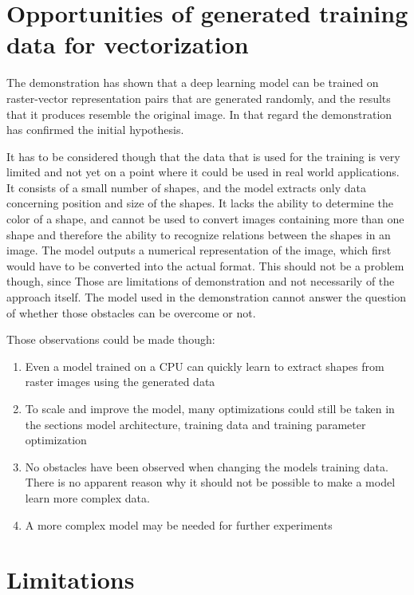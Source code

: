 \documentclass[12pt, a4paper, titlepage]{report}
\begin{document}
\section{Opportunities of generated training data for vectorization}

The demonstration has shown that a deep learning model can be trained on raster-vector representation pairs that are generated randomly, and the results that it produces resemble the original image. In that regard the demonstration has confirmed the initial hypothesis.

It has to be considered though that the data that is used for the training is very limited and not yet on a point where it could be used in real world applications. It consists of a small number of shapes, and the model extracts only data concerning position and size of the shapes. It lacks the ability to determine the color of a shape, and cannot be used to convert images containing more than one shape and therefore the ability to recognize relations between the shapes in an image. The model outputs a numerical representation of the image, which first would have to be converted into the actual format. This should not be a problem though, since 
Those are limitations of demonstration and not necessarily of the approach itself. The model used in the demonstration cannot answer the question of whether those obstacles can be overcome or not.

Those observations could be made though:

\begin{enumerate}[label=\Roman*]
   \item Even a model trained on a CPU can quickly learn to extract shapes from raster images using the generated data
   \item To scale and improve the model, many optimizations could still be taken in the sections model architecture, training data and training parameter optimization
   \item No obstacles have been observed when changing the models training data. There is no apparent reason why it should not be possible to make a model learn more complex data.
   \item A more complex model may be needed for further experiments
\end{enumerate}


\section{Limitations}
\end{document}
